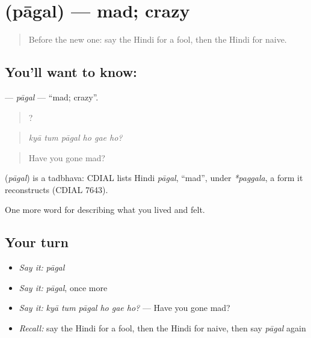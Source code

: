 \section[\texorpdfstring{\hi{पागल} (pāgal)}{पागल (pāgal)}]{ (pāgal) — mad; crazy}

\label{lesson:HI-C474-pagal}



\begin{quote}
Before the new one: say the Hindi for a fool, then the Hindi for naive.
\end{quote}

\subsection*{You'll want to know: }
\textbf{} — \emph{pāgal} — \textquotedblleft{}mad; crazy\textquotedblright{}.

\begin{quote}
     ?
\end{quote}

\begin{quote}
\emph{kyā tum pāgal ho gae ho?}
\end{quote}

\begin{quote}
Have you gone mad?
\end{quote}

\begin{cousinweb}
\textbf{} (\emph{pāgal}) is a tadbhava: CDIAL lists Hindi \emph{pāgal}, \textquotedblleft{}mad\textquotedblright{}, under \emph{*paggala}, a form it reconstructs (CDIAL 7643).
\end{cousinweb}

\begin{grammarlens}[title={What you've built}]
One more word for describing what you lived and felt.
\end{grammarlens}

\subsection*{Your turn}
\begin{itemize}
\raggedright
  \item \emph{Say it:} \emph{pāgal}
  \item \emph{Say it:} \emph{pāgal}, once more
  \item \emph{Say it:} \emph{kyā tum pāgal ho gae ho?} — Have you gone mad?
  \item \emph{Recall:} say the Hindi for a fool, then the Hindi for naive, then say \emph{pāgal} again
\end{itemize}


